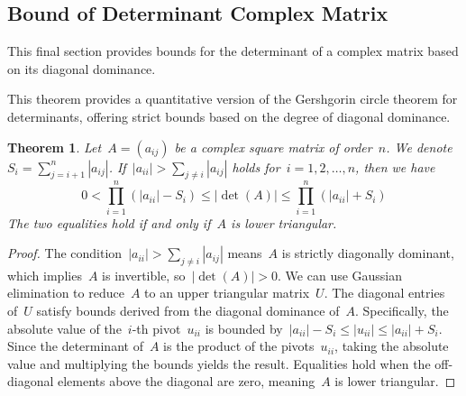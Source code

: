 \documentclass[12pt]{article}
\newtheorem{theorem}{Theorem}[section]
\begin{document}
\subsection{Bound of Determinant Complex Matrix}
This final section provides bounds for the determinant of a complex matrix based on its diagonal dominance.

\noindent This theorem provides a quantitative version of the Gershgorin circle theorem for determinants, offering strict bounds based on the degree of diagonal dominance.
\begin{theorem}
Let~$A = (a_{ij})$ be a complex square matrix of order~$n$. We denote~$S_i = \sum_{j=i+1}^n |a_{ij}|$. If~$|a_{ii}| > \sum_{j \neq i} |a_{ij}|$ holds for~$i = 1, 2, \dots, n$, then we have
\[ 0 < \prod_{i=1}^n (|a_{ii}| - S_i) \le |\det(A)| \le \prod_{i=1}^n (|a_{ii}| + S_i) \]
The two equalities hold if and only if~$A$ is lower triangular.
\end{theorem}
\begin{proof}
The condition~$|a_{ii}| > \sum_{j \neq i} |a_{ij}|$ means~$A$ is strictly diagonally dominant, which implies~$A$ is invertible, so~$|\det(A)| > 0$. We can use Gaussian elimination to reduce~$A$ to an upper triangular matrix~$U$. The diagonal entries of~$U$ satisfy bounds derived from the diagonal dominance of~$A$. Specifically, the absolute value of the~$i$-th pivot~$u_{ii}$ is bounded by~$|a_{ii}| - S_i \le |u_{ii}| \le |a_{ii}| + S_i$. Since the determinant of~$A$ is the product of the pivots~$u_{ii}$, taking the absolute value and multiplying the bounds yields the result. Equalities hold when the off-diagonal elements above the diagonal are zero, meaning~$A$ is lower triangular.
\end{proof}
\end{document}
